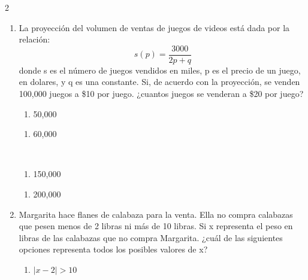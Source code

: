 \documentclass[10.5pt,letterpaper]{article}
\begin{document}
\begin{multicols}{2}
\begin{enumerate}
\begin{minipage}{0.23\linewidth}
\begin{enumerate}
\end{enumerate}
\end{minipage}
\item La proyección del volumen de ventas de juegos de videos está dada por la relación:
\begin{equation*}
s(p)=\frac{3000}{2p+q}
\end{equation*}
donde s es el número de juegos vendidos en miles, p es el precio de un juego, en dolares, y q es una constante. Si, de acuerdo con la proyección, se venden 100,000 juegos a \$10 por juego. ¿cuantos juegos se venderan a \$20 por juego?\\
\begin{minipage}{0.34\linewidth}
\begin{enumerate}
\item[a)] 50,000
\end{enumerate}
\end{minipage}
\begin{minipage}{0.34\linewidth}
\begin{enumerate}
\item[b)] 60,000
\end{enumerate}
\end{minipage}\\
\begin{minipage}{0.34\linewidth}
\begin{enumerate}
\item[c)] 150,000
\end{enumerate}
\end{minipage}
\begin{minipage}{0.34\linewidth}
\begin{enumerate}
\item[d)]200,000
\end{enumerate}
\end{minipage}
\item Margarita hace flanes de calabaza para la venta. Ella no compra calabazas que pesen menos de 2 libras ni más de 10 libras. Si x representa el peso en libras de las calabazas que no compra Margarita. ¿cuál de las siguientes opciones representa todos los posibles valores de x?\\
\begin{minipage}{0.5\linewidth}
\begin{enumerate}
\item[a)] $|x-2|>10$
\end{enumerate}
\end{minipage}\\

\end{enumerate}
\end{multicols}
\end{document}
